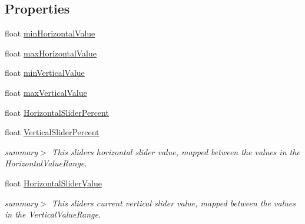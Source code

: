 \subsection*{Properties}
\begin{DoxyCompactItemize}
\item 
float \mbox{\hyperlink{class_leap_1_1_unity_1_1_interaction_1_1_interaction_slider_ade7f328906f7f69b399cd4484fff243b}{min\+Horizontal\+Value}}
\item 
float \mbox{\hyperlink{class_leap_1_1_unity_1_1_interaction_1_1_interaction_slider_a1ff30cd526fda7b40abe4f0272516b26}{max\+Horizontal\+Value}}
\item 
float \mbox{\hyperlink{class_leap_1_1_unity_1_1_interaction_1_1_interaction_slider_a4896afd67be05e27600197d4ce85be50}{min\+Vertical\+Value}}
\item 
float \mbox{\hyperlink{class_leap_1_1_unity_1_1_interaction_1_1_interaction_slider_a4fb7772dfe4873192bcdcf35bb736dfe}{max\+Vertical\+Value}}
\item 
float \mbox{\hyperlink{class_leap_1_1_unity_1_1_interaction_1_1_interaction_slider_a0839fc6a18dac7cf052443c90735ae83}{Horizontal\+Slider\+Percent}}
\item 
float \mbox{\hyperlink{class_leap_1_1_unity_1_1_interaction_1_1_interaction_slider_a15270101be432ad4caad1ef425626989}{Vertical\+Slider\+Percent}}
\begin{DoxyCompactList}\small\item\em summary$>$ This slider\textquotesingle{}s horizontal slider value, mapped between the values in the Horizontal\+Value\+Range. \end{DoxyCompactList}\item 
float \mbox{\hyperlink{class_leap_1_1_unity_1_1_interaction_1_1_interaction_slider_ac9ef0803e7785ff6ef45efe362c8d2cb}{Horizontal\+Slider\+Value}}
\begin{DoxyCompactList}\small\item\em summary$>$ This slider\textquotesingle{}s current vertical slider value, mapped between the values in the Vertical\+Value\+Range. \end{DoxyCompactList}\item 

\end{DoxyCompactItemize}
